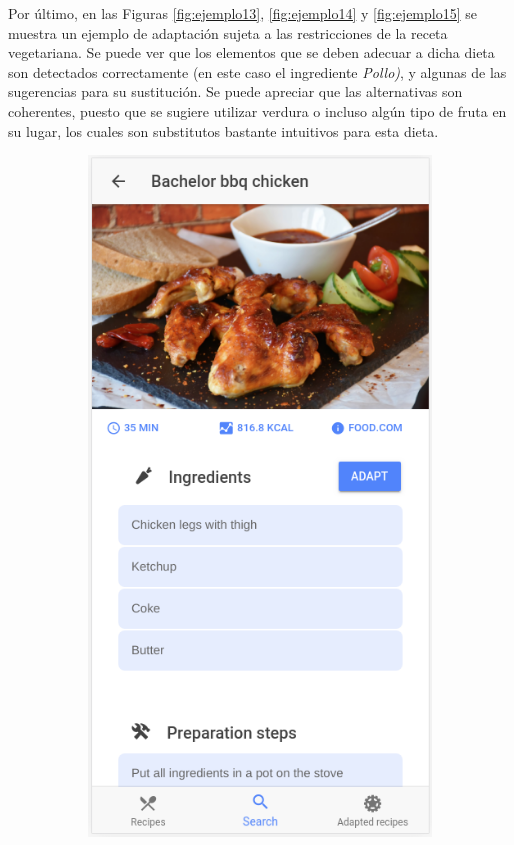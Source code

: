 Por último, en las Figuras \ref{fig:ejemplo13}, \ref{fig:ejemplo14} y \ref{fig:ejemplo15} se muestra un ejemplo de adaptación sujeta a las restricciones de la
receta vegetariana. Se puede ver que los elementos que se deben adecuar a dicha dieta son       detectados correctamente (en este caso el ingrediente \textit{Pollo)}, y algunas de las sugerencias para su sustitución. Se puede apreciar que las alternativas son coherentes, puesto que se sugiere utilizar verdura o incluso algún tipo de fruta en su lugar, los cuales son substitutos bastante intuitivos para esta dieta.

\begin{figure}[H]
    \centering
    \begin{subfigure}[b]{0.31\linewidth}
        \includegraphics[width=\linewidth]{imagenes/app/pantallas/ejemplo13.png}

\end{subfigure}
\end{figure}
